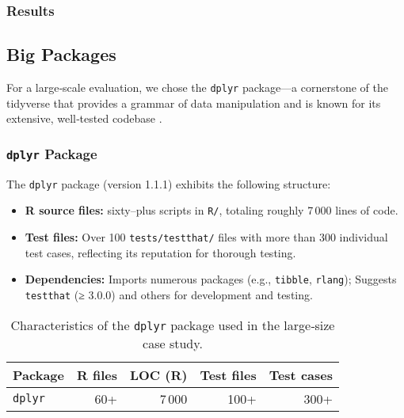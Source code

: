 \subsubsection{Results}


\subsection{Big Packages}

For a large‐scale evaluation, we chose the \texttt{dplyr} package—a cornerstone of the tidyverse that provides a grammar of data manipulation and is known for its extensive, well‐tested codebase \cite{wickham2023dplyr}.

\subsubsection{\texttt{dplyr} Package}

The \texttt{dplyr} package (version 1.1.1) exhibits the following structure:

\begin{itemize}
  \item \textbf{R source files:}  sixty–plus scripts in \texttt{R/}, totaling roughly 7\,000 lines of code.
  \item \textbf{Test files:} Over 100 \texttt{tests/testthat/} files with more than 300 individual test cases, reflecting its reputation for thorough testing.
  \item \textbf{Dependencies:} Imports numerous packages (e.g., \texttt{tibble}, \texttt{rlang}); Suggests \texttt{testthat} (≥ 3.0.0) and others for development and testing.
\end{itemize}

\begin{table}[htbp]
  \centering
  \begin{tabular}{lrrrr}
    \toprule
    Package   & R files & LOC (R) & Test files & Test cases \\
    \midrule
    \texttt{dplyr} & 60+     & 7\,000    & 100+       & 300+       \\
    \bottomrule
  \end{tabular}
  \caption{Characteristics of the \texttt{dplyr} package used in the large‐size case study.}
  \label{tab:dplyr-metrics}
\end{table}

